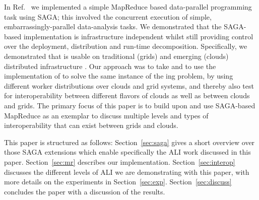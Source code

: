 \documentclass[3p,twocolumn]{elsarticle}
\begin{document}

In Ref.~\cite{saga_ccgrid09} we implemented a simple MapReduce based
data-parallel programming task using SAGA; this involved the
concurrent execution of simple, embarrassingly-parallel data-analysis
tasks.  We demonstrated that the SAGA-based implementation is
infrastructure independent whilst still providing control over the
deployment, distribution and run-time decomposition.  Specifically, we
demonstrated that \sagamapreduce is usable on traditional (grids) and
emerging (clouds) distributed infrastructure .  Our
approach was to take \sagamapreduce and to use the 
implementation of \sagamapreduce to solve the same instance of the
{\wc}ing problem, by using different worker distributions over clouds
and grid systems, and thereby also test for interoperability between
different flavors of clouds as well as between clouds and grids.  The
primary focus of this paper is to build upon and use SAGA-based
MapReduce as an exemplar to discuss multiple levels and types of
interoperability that can exist between grids and clouds.

  

This paper is structured as follows: Section~\ref{sec:saga} gives a
short overview over those SAGA extensions which enable specifically
the ALI work discussed in this paper.  Section~\ref{sec:mr} describes
our \smr implementation.  Section~\ref{sec:interop} discusses the
different levels of ALI we are demonstrating with this paper, with
more details on the experiments in Section~\ref{sec:exp}.
Section~\ref{sec:discuss} concludes the paper with a discussion of the
results.





\end{document}
